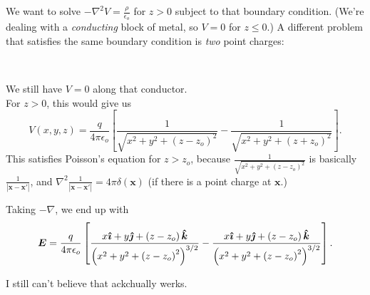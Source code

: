 \documentclass{article}
\begin{document}
We want to solve $-\nabla^2 V = \frac{\rho}{\epsilon_o}$ for $z > 0$ subject to that boundary condition. (We're dealing with a \emph{conducting} block of metal, so $V = 0$ for $z \leqslant 0$.) A different problem that satisfies the same boundary condition is \emph{two} point charges:

\begin{minipage}{0.31\textwidth}
\begin{figure}[H]
\centering
{}
\end{figure}
\end{minipage}
~
\begin{minipage}{0.67\textwidth}
We still have $V = 0$ along that conductor. \\[1em]
For $z > 0$, this would give us
\begin{equation*}
    V(x,y,z) = \frac{q}{4\pi\epsilon_o} \left[ \frac{1}{\sqrt{x^2 + y^2 + \left( z - z_o \right)^2}} - \frac{1}{\sqrt{x^2 + y^2 + \left( z + z_o \right)^2}} \right].
\end{equation*}
This satisfies Poisson's equation for $z > z_o$, because $\frac{1}{\sqrt{x^2 + y^2 + \left( z - z_o \right)^2}}$ is basically $\frac{1}{\left| \bm{x} - \bm{x'} \right|}$, and $\nabla^2 \frac{1}{\left| \bm{x} - \bm{x'} \right|} = 4\pi \delta(\bm{x})$ (if there is a point charge at $\bm{x}$.)
\end{minipage}

\vspace{1.4em}

Taking $-\nabla$, we end up with
\begin{equation*}
    \bm{E} = \frac{q}{4\pi\epsilon_o} \left[ \frac{x \bm{\hat{\imath}} + y \bm{\hat{\jmath}} + \left( z - z_o \right) \bm{\hat{k}}}{\left( x^2 + y^2 + \left( z - z_o \right)^2 \right)^{3/2}} - \frac{x \bm{\hat{\imath}} + y \bm{\hat{\jmath}} + \left( z - z_o \right) \bm{\hat{k}}}{\left( x^2 + y^2 + \left( z - z_o \right)^2 \right)^{3/2}} \right].
\end{equation*}

I still can't believe that ackchually werks.
\end{document}
